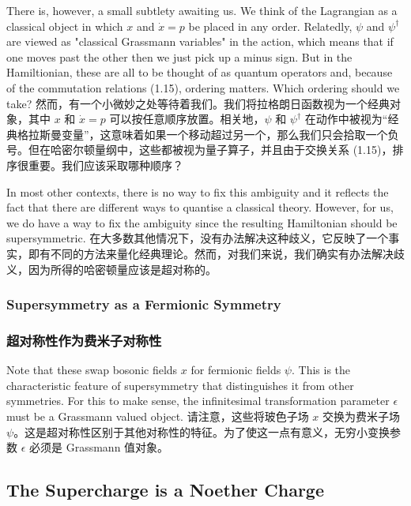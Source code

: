 \documentclass{article}
\begin{document}
\begin{paracol}{2}
There is, however, a small subtlety awaiting us. We think of the Lagrangian as a classical object in which $x$ and $\dot{x} = p$ be placed in any order. Relatedly, $\psi$ and $\psi^{\dagger}$ are viewed as "classical Grassmann variables" in the action, which means that if one moves past the other then we just pick up a minus sign. But in the Hamiltionian, these are all to be thought of as quantum operators and, because of the commutation relations (1.15), ordering matters. Which ordering should we take?
\switchcolumn
然而，有一个小微妙之处等待着我们。我们将拉格朗日函数视为一个经典对象，其中 $x$ 和 $\dot{x} = p$ 可以按任意顺序放置。相关地，$\psi$ 和 $\psi^{\dagger}$ 在动作中被视为“经典格拉斯曼变量”，这意味着如果一个移动超过另一个，那么我们只会拾取一个负号。但在哈密尔顿量纲中，这些都被视为量子算子，并且由于交换关系 (1.15)，排序很重要。我们应该采取哪种顺序？
\switchcolumn*

In most other contexts, there is no way to fix this ambiguity and it reflects the fact that there are different ways to quantise a classical theory. However, for us, we do have a way to fix the ambiguity since the resulting Hamiltonian should be supersymmetric.
\switchcolumn
在大多数其他情况下，没有办法解决这种歧义，它反映了一个事实，即有不同的方法来量化经典理论。然而，对我们来说，我们确实有办法解决歧义，因为所得的哈密顿量应该是超对称的。
\switchcolumn*

\subsubsection{Supersymmetry as a Fermionic Symmetry}
\switchcolumn
\subsubsection*{超对称性作为费米子对称性}
\switchcolumn*

Note that these swap bosonic fields $x$ for fermionic fields $\psi$. This is the characteristic feature of supersymmetry that distinguishes it from other symmetries. For this to make sense, the infinitesimal transformation parameter $\epsilon$ must be a Grassmann valued object.
\switchcolumn
请注意，这些将玻色子场 $x$ 交换为费米子场 $\psi$。这是超对称性区别于其他对称性的特征。为了使这一点有意义，无穷小变换参数 $\epsilon$ 必须是 Grassmann 值对象。
\switchcolumn*

\subsection*{The Supercharge is a Noether Charge}
\switchcolumn

\end{paracol}
\end{document}
